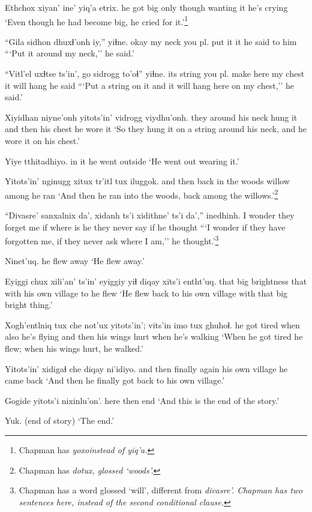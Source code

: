 \documentclass[12pt]{article}
\begin{document}
\gll Ethchox xiyan' ine' yiq'a  etrix.
{he got big} only though {wanting it} {he's crying}
\glt `Even though he had become big, he cried for it.'\footnote{Chapman has \em yoxo\em instead of \em yiq'a.}
\glend

\gll ``Gila sidhon dhuxɬ'onh iy,'' yiɬne.
okay {my neck} {you pl. put it} it {he said to him}
\glt ```Put it around my neck,'' he said.' 
\glend

\gll ``Vitl'el uxɬtse ts'in', go sidrogg to'oɬ''  yiɬne.
{its string} {you pl. make} {} here {my chest} {it will hang} {he said}
\glt ```Put a string on it and it will hang here on my chest,'' he said.'
\glend

\gll Xiyidhan niyne'onh yitots'in' vidrogg viydhu'onh.
{they around his neck} {hung it} {and then} {his chest} {he wore it}
\glt `So they hung it on a string around his neck, and he wore it on his chest.'
\glend

\gll Yiye tthitadhiyo.
{in it} {he went outside}
\glt `He went out wearing it.'
\glend

\gll Yitots'in' {nginugg xitux} tr'itl tux iluggok.
{and then} {back in the woods} willow among {he ran}
\glt `And then he ran into the woods, back among the willows.'\footnote{Chapman has \em dotux\em, glossed `woods'.}
\glend

\gll ``Divasre' sanxalnix da', xidanh ts'i {xidithne' ts'i} da','' inedhinh.
{I wonder} {they forget me} if {where is he} {} {they never say} if {he thought}
\glt ```I wonder if they have forgotten me, if they never ask where I am,'' he thought.'\footnote{Chapman has a word glossed `will', different from \em divasre'.  Chapman has two sentences here, instead of the second conditional clause.}
\glend

\gll Ninet'uq. 
{{he flew away  }}
\glt `He flew away.'
\glend

\gll Eyiggi chux xili'an' ts'in' eyiggiy yiɬ diqay xits'i entht'uq.
that big brightness {} that with {his own village} to {he flew}
\glt `He flew back to his own village with that big bright thing.'
\glend

\gll Xogh'entlniq tux che not'ux yitots'in'; vits'in imo tux ghuhoɬ.
{he got tired} when also {he's flying}  {and then} {his wings} hurt when {he's walking}
\glt `When he got tired he flew; when his wings hurt, he walked.'
\glend

\gll Yitots'in' xidigaɬ  che diqay   ni'idiyo.
{and then} finally  again {his own village} {he came back}
\glt `And then he finally got back to his own village.'  
\glend

\gll Gogide yitots'i nixinlu'on'.
here  then end
\glt `And this is the end of the story.'
\glend

\gll Yuk.
{{(end of story)}}
\glt `The end.'
\glend
\end{document}
